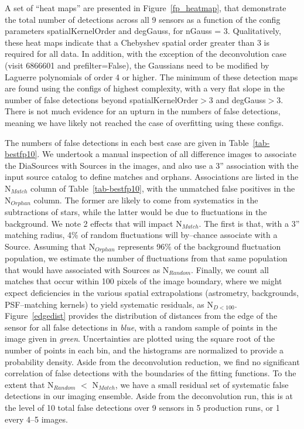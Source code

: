 \documentclass[prd, nofootinbib, floatfix, 11pt,tightenlines,times]{article}
\begin{document}
A set of ``heat maps'' are presented in Figure~\ref{fp_heatmap}, that
demonstrate the total number of detections across all 9 sensors as a
function of the config parameters spatialKernelOrder and degGauss, for
nGauss = 3.  Qualitatively, these heat maps indicate that a Chebyshev
spatial order greater than 3 is required for all data.  In addition,
with the exception of the deconvolution case (visit 6866601 and
prefilter=False), the Gaussians need to be modified by Laguerre
polynomials of order 4 or higher.  The minimum of these detection maps
are found using the configs of highest complexity, with a very flat
slope in the number of false detections beyond spatialKernelOrder$>$3
and degGauss$>$3.  There is not much evidence for an upturn in the
numbers of false detections, meaning we have likely not reached the
case of overfitting using these configs.

The numbers of false detections in each best case are given in
Table~\ref{tab-bestfp10}.  We undertook a manual inspection of all
difference images to associate the DiaSources with Sources in the
images, and also use a 3'' association with the input source catalog
to define matches and orphans.  Associations are listed in the
N$_{Match}$ column of Table~\ref{tab-bestfp10}, with the unmatched
false positives in the N$_{Orphan}$ column.  The former are likely to
come from systematics in the subtractions of stars, while the latter
would be due to fluctuations in the background.  We note 2 effects
that will impact N$_{Match}$.  The first is that, with a 3'' matching
radius, 4\% of random fluctuations will by--chance associate with a
Source.  Assuming that N$_{Orphan}$ represents 96\% of the background
fluctuation population, we estimate the number of fluctuations from
that same population that would have associated with Sources as
N$_{Random}$.  Finally, we count all matches that occur within 100
pixels of the image boundary, where we might expect deficiencies in
the various spatial extrapolations (astrometry, backgrounds,
PSF--matching kernels) to yield systematic residuals, as N$_{D<100}$.
Figure~\ref{edgedist} provides the distribution of distances from the
edge of the sensor for all false detections in {\it blue}, with a
random sample of points in the image given in {\it green}.
Uncertainties are plotted using the square root of the number of
points in each bin, and the histograms are normalized to provide a
probability density.  Aside from the deconvolution reduction, we find
no significant correlation of false detections with the boundaries of
the fitting functions.  To the extent that N$_{Random}$ $<$
N$_{Match}$, we have a small residual set of systematic false
detections in our imaging ensemble.  Aside from the deconvolution run,
this is at the level of 10 total false detections over 9 sensors in 5
production runs, or 1 every 4--5 images.
\end{document}
